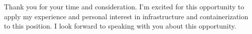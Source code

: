 \documentclass[11pt, letter]{awesome-cv}
\begin{document}
\begin{cvletter}
Thank you for your time and consideration.
I'm excited for this opportunity to apply my experience and 
personal interest in infrastructure and containerization
to this position. I look forward to speaking with you about this opportunity.

\end{cvletter}


\makeletterclosing
\end{document}
